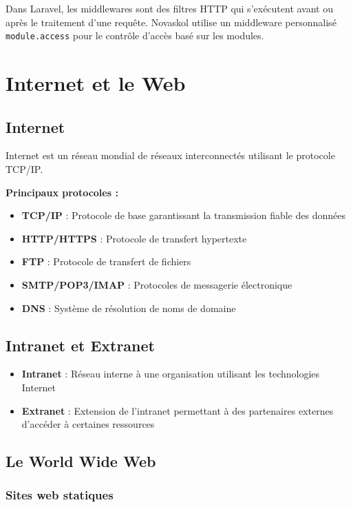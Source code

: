 \documentclass[12pt,a4paper,twoside]{report}
\begin{document}
Dans Laravel, les middlewares sont des filtres HTTP qui s'exécutent avant ou après le traitement d'une requête. Novaskol utilise un middleware personnalisé \texttt{module.access} pour le contrôle d'accès basé sur les modules.

\section{Internet et le Web}

\subsection{Internet}

Internet est un réseau mondial de réseaux interconnectés utilisant le protocole TCP/IP.

\textbf{Principaux protocoles :}
\begin{itemize}
    \item \textbf{TCP/IP} : Protocole de base garantissant la transmission fiable des données
    \item \textbf{HTTP/HTTPS} : Protocole de transfert hypertexte
    \item \textbf{FTP} : Protocole de transfert de fichiers
    \item \textbf{SMTP/POP3/IMAP} : Protocoles de messagerie électronique
    \item \textbf{DNS} : Système de résolution de noms de domaine
\end{itemize}

\subsection{Intranet et Extranet}

\begin{itemize}
    \item \textbf{Intranet} : Réseau interne à une organisation utilisant les technologies Internet
    \item \textbf{Extranet} : Extension de l'intranet permettant à des partenaires externes d'accéder à certaines ressources
\end{itemize}

\subsection{Le World Wide Web}

\subsubsection{Sites web statiques}
\end{document}
